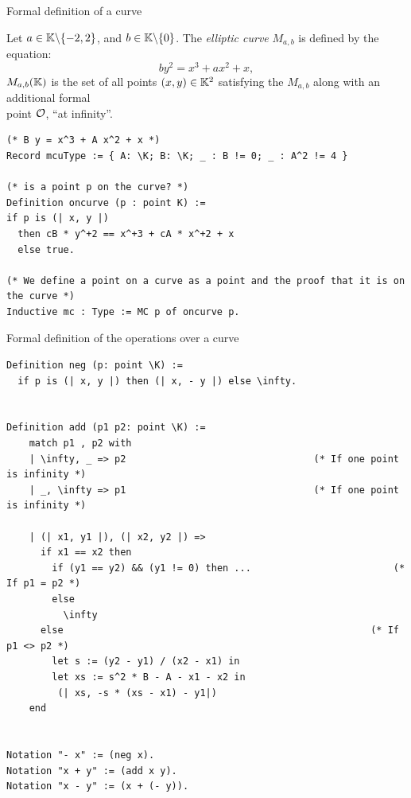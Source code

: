 \documentclass[8pt,aspectratio=169]{beamer}
\begin{document}
%
%
\begin{frame}[fragile]{Formal definition of a curve}

	\begin{dfn}
		Let $a \in \mathbb{K} \backslash \{-2, 2\}$, and $b \in \mathbb{K} \backslash \{ 0\}$. The \textit{elliptic curve} $M_{a,b}$ is defined by the equation:
		$$by^2 = x^3 + ax^2 + x,$$
		$M_{a,b}(\mathbb{K})$ is the set of all points $(x,y) \in \mathbb{K}^2$ satisfying the $M_{a,b}$ along with an additional formal\\
		point $\mathcal{O}$, ``at infinity''.
	\end{dfn}

	\begin{center}
		\begin{lstlisting}[language=Coq, basicstyle=\normalsize]
(* B y = x^3 + A x^2 + x *)
Record mcuType := { A: \K; B: \K; _ : B != 0; _ : A^2 != 4 }

(* is a point p on the curve? *)
Definition oncurve (p : point K) :=
if p is (| x, y |)
  then cB * y^+2 == x^+3 + cA * x^+2 + x
  else true.

(* We define a point on a curve as a point and the proof that it is on the curve *)
Inductive mc : Type := MC p of oncurve p.
\end{lstlisting}
	\end{center}
\end{frame}


%
%
\begin{frame}[fragile]{Formal definition of the operations over a curve}
	\begin{center}
		\begin{lstlisting}[language=Coq, basicstyle=\normalsize]
Definition neg (p: point \K) :=
  if p is (| x, y |) then (| x, - y |) else \infty.


Definition add (p1 p2: point \K) :=
    match p1 , p2 with
    | \infty, _ => p2                                 (* If one point is infinity *)
    | _, \infty => p1                                 (* If one point is infinity *)

    | (| x1, y1 |), (| x2, y2 |) =>
      if x1 == x2 then
        if (y1 == y2) && (y1 != 0) then ...                         (* If p1 = p2 *)
        else
          \infty
      else                                                      (* If p1 <> p2 *)
        let s := (y2 - y1) / (x2 - x1) in
        let xs := s^2 * B - A - x1 - x2 in
         (| xs, -s * (xs - x1) - y1|)
    end


Notation "- x" := (neg x).
Notation "x + y" := (add x y).
Notation "x - y" := (x + (- y)).
\end{lstlisting}
	\end{center}
\end{frame}
\end{document}
